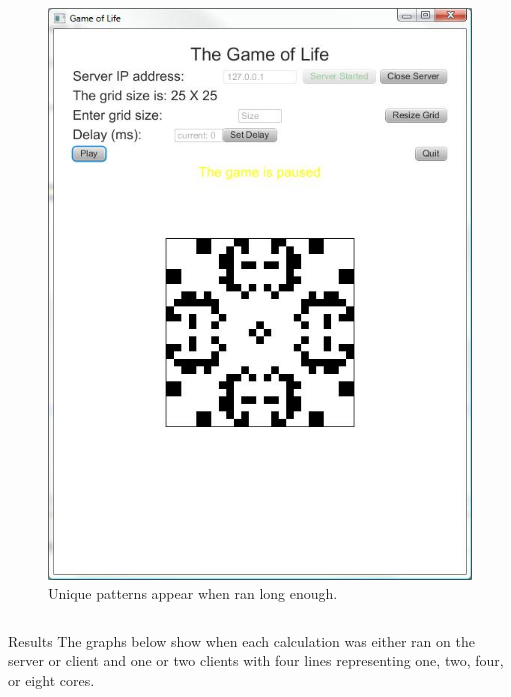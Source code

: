 \documentclass[final]{beamer}
\newlength{\onecolwid}
\newlength{\twocolwid}
\begin{document}
\begin{frame}[t]
\begin{columns}[t]
\begin{column}{\twocolwid}
\begin{columns}[t,totalwidth=\twocolwid]
\begin{column}{\onecolwid}\vspace{-.6in} %
\begin{block}{}
\begin{figure}
\includegraphics[width=.7\linewidth]{gol2.jpg}
\centering \caption{Unique patterns appear when ran long enough.}
\end{figure}
\end{block}

\end{column} %

\end{columns} %

\begin{columns}[t,totalwidth=\twocolwid] %

\begin{column}{\twocolwid} %


\begin{block}{Results}
The graphs below show when each calculation was either ran on the server or client and one or two clients with four lines representing one, two, four, or eight cores. 


\end{block}
\end{column}
\end{columns}
\end{column}
\end{columns}
\end{frame}
\end{document}
